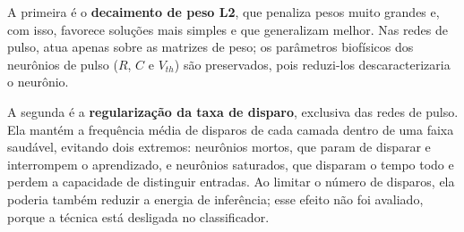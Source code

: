 			\par A primeira é o \textbf{decaimento de peso L2}, que penaliza pesos muito grandes e, com isso, favorece soluções mais simples e que generalizam melhor. Nas redes de pulso, atua apenas sobre as matrizes de peso; os parâmetros biofísicos dos neurônios de pulso ($R$, $C$ e $V_{th}$) são preservados, pois reduzi-los descaracterizaria o neurônio.

			\par A segunda é a \textbf{regularização da taxa de disparo}, exclusiva das redes de pulso. Ela mantém a frequência média de disparos de cada camada dentro de uma faixa saudável, evitando dois extremos: neurônios mortos, que param de disparar e interrompem o aprendizado, e neurônios saturados, que disparam o tempo todo e perdem a capacidade de distinguir entradas. Ao limitar o número de disparos, ela poderia também reduzir a energia de inferência; esse efeito não foi avaliado, porque a técnica está desligada no classificador.
			
